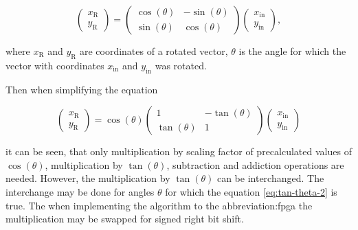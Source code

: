 \documentclass[a4paper, twoside, 11pt]{article}
\begin{document}
        \begin{equation}\label{eq:rotation}
             \begin{pmatrix}
                 x_\text{R}\\
                 y_\text{R}
             \end{pmatrix}
             =
             \begin{pmatrix}
                 \cos (\theta) & -\sin (\theta)\\
                 \sin (\theta) & \cos (\theta)
             \end{pmatrix}
             \begin{pmatrix}
                 x_\text{in}\\
                 y_\text{in}
             \end{pmatrix},
        \end{equation}

        where $x_\text{R}$ and $y_\text{R}$ are coordinates of a rotated vector, $\theta$ is the angle for which the vector with coordinates $x_\text{in}$ and $y_\text{in}$ was rotated.\par
        Then when simplifying the equation


        \begin{equation}\label{eq:rotation-simplifying}
             \begin{pmatrix}
                 x_\text{R}\\
                 y_\text{R}
             \end{pmatrix}
             = \cos (\theta)
             \begin{pmatrix}
                 1 & -\tan (\theta)\\
                 \tan (\theta) & 1
             \end{pmatrix}
             \begin{pmatrix}
                 x_\text{in}\\
                 y_\text{in}
             \end{pmatrix}
        \end{equation}

        it can be seen, that only multiplication by scaling factor of precalculated values of $\cos (\theta)$, multiplication by $\tan (\theta)$, subtraction and addiction operations are needed. However, the multiplication by $\tan (\theta)$ can be interchanged. The interchange may be done for angles $\theta$ for which the equation \ref{eq:tan-theta-2} is true. The when implementing the algorithm to the \gls{abbreviation:fpga} the multiplication may be swapped for signed right bit shift.
\end{document}
